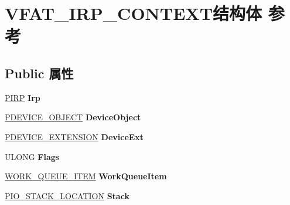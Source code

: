 \hypertarget{struct_v_f_a_t___i_r_p___c_o_n_t_e_x_t}{}\section{V\+F\+A\+T\+\_\+\+I\+R\+P\+\_\+\+C\+O\+N\+T\+E\+X\+T结构体 参考}
\label{struct_v_f_a_t___i_r_p___c_o_n_t_e_x_t}
\subsection*{Public 属性}
\begin{DoxyCompactItemize}
\item 
\mbox{\label{struct_v_f_a_t___i_r_p___c_o_n_t_e_x_t_aec96f410e32b91f54780687da2e0d881}} 
\hyperlink{interfacevoid}{P\+I\+RP} {\bfseries Irp}
\item 
\mbox{\label{struct_v_f_a_t___i_r_p___c_o_n_t_e_x_t_a2bc3ca991ac2ba81e319d0337c10a25a}} 
\hyperlink{struct___d_e_v_i_c_e___o_b_j_e_c_t}{P\+D\+E\+V\+I\+C\+E\+\_\+\+O\+B\+J\+E\+CT} {\bfseries Device\+Object}
\item 
\mbox{\label{struct_v_f_a_t___i_r_p___c_o_n_t_e_x_t_abd3eb3882f85cda202ebeca7558a3715}} 
\hyperlink{struct___b_e_e_p___d_e_v_i_c_e___e_x_t_e_n_s_i_o_n}{P\+D\+E\+V\+I\+C\+E\+\_\+\+E\+X\+T\+E\+N\+S\+I\+ON} {\bfseries Device\+Ext}
\item 
\mbox{\label{struct_v_f_a_t___i_r_p___c_o_n_t_e_x_t_a57a6e6359c7210950c198e4738200b06}} 
U\+L\+O\+NG {\bfseries Flags}
\item 
\mbox{\label{struct_v_f_a_t___i_r_p___c_o_n_t_e_x_t_aaca063853975b684955aa13e4c92da33}} 
\hyperlink{struct___w_o_r_k___q_u_e_u_e___i_t_e_m}{W\+O\+R\+K\+\_\+\+Q\+U\+E\+U\+E\+\_\+\+I\+T\+EM} {\bfseries Work\+Queue\+Item}
\item 
\mbox{\label{struct_v_f_a_t___i_r_p___c_o_n_t_e_x_t_ac0a8aaf2ce10dc907b4fa095b4dacec6}} 
\hyperlink{struct___i_o___s_t_a_c_k___l_o_c_a_t_i_o_n}{P\+I\+O\+\_\+\+S\+T\+A\+C\+K\+\_\+\+L\+O\+C\+A\+T\+I\+ON} {\bfseries Stack}

\end{DoxyCompactItemize}
